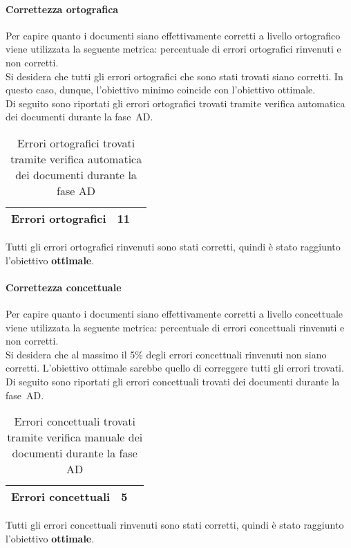 \documentclass[../PianoDiQualifica.tex]{subfiles}
\begin{document}
\begin{appendices}
			\paragraph{Correttezza ortografica}
			Per capire quanto i documenti siano effettivamente corretti a livello ortografico viene utilizzata la seguente metrica: percentuale di errori ortografici rinvenuti e non corretti.\\
			Si desidera che tutti gli errori ortografici che sono stati trovati siano corretti. In questo caso, dunque, l'obiettivo minimo coincide con l’obiettivo ottimale.\\
			Di seguito sono riportati gli errori ortografici trovati tramite verifica automatica dei documenti durante la fase\g\ AD.
			\begin{table}[H]
				\centering
				\begin{tabular}{l * {2}{c}}
					\midrule
					Errori ortografici & 11 \\
					\midrule
				\end{tabular}
				\caption{Errori ortografici trovati tramite verifica automatica dei documenti durante la fase AD}
				\label{tab:errori_automatica}
			\end{table}
			Tutti gli errori ortografici rinvenuti sono stati corretti, quindi è stato raggiunto l'obiettivo \textbf{ottimale}.
			
			\paragraph{Correttezza concettuale}
			Per capire quanto i documenti siano effettivamente corretti a livello concettuale viene utilizzata la seguente metrica: percentuale di errori concettuali rinvenuti e non corretti.\\
			Si desidera che al massimo il 5\% degli errori concettuali rinvenuti non siano corretti. L’obiettivo ottimale sarebbe quello di correggere tutti gli errori trovati. \\
			Di seguito sono riportati gli errori concettuali trovati dei documenti durante la fase\g\ AD.
			\begin{table}[H]
				\centering
				\begin{tabular}{l * {2}{c}}
					\midrule
					Errori concettuali & 5 \\
					\midrule
				\end{tabular}
				\caption{Errori concettuali trovati tramite verifica manuale dei documenti durante la fase AD}
				\label{tab:errori_concettuali}
			\end{table}
			Tutti gli errori concettuali rinvenuti sono stati corretti, quindi è stato raggiunto l'obiettivo \textbf{ottimale}.
			
\end{appendices}
\end{document}

